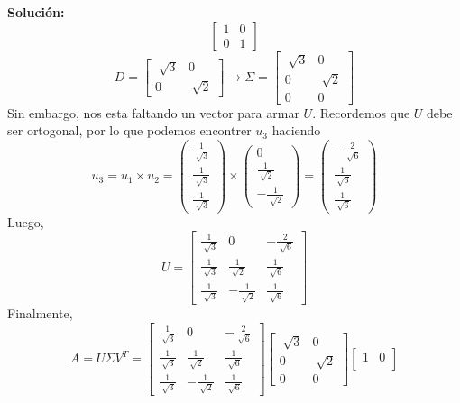 \documentclass[12pt]{article}
\newenvironment{solucion}
{\begin{mdframed}[backgroundcolor=black!10]
		{\bf Solución:}\\
	}
	{
	\end{mdframed}
}
\newenvironment{preguntas}
{\begin{enumerate}\itemsep12pt
	}
	{
	\end{enumerate}
}
\newcommand{\ra}{\rightarrow}
\begin{document}
\begin{preguntas}
\begin{solucion}
$$\begin{bmatrix}
1 & 0 \\
0 & 1
\end{bmatrix}$$
$$D = \begin{bmatrix}
\sqrt[]{3} & 0 \\
0 & \sqrt[]{2}
\end{bmatrix} \ra \Sigma = \begin{bmatrix}
\sqrt[]{3} & 0 \\
0 & \sqrt[]{2}\\
0 & 0
\end{bmatrix}$$
Sin embargo, nos esta faltando un vector para armar $U$. Recordemos que $U$ debe ser ortogonal, por lo que podemos encontrer $u_3$ haciendo
$$u_3 = u_1 \times u_2 = \begin{pmatrix}
\frac{1}{\sqrt[]{3}} \\
\frac{1}{\sqrt[]{3}} \\
\frac{1}{\sqrt[]{3}}
\end{pmatrix} \times 
\begin{pmatrix}
0 \\
\frac{1}{\sqrt[]{2}} \\
-\frac{1}{\sqrt[]{2}}
\end{pmatrix} =
\begin{pmatrix}
-\frac{2}{\sqrt[]{6}} \\
\frac{1}{\sqrt[]{6}} \\
\frac{1}{\sqrt[]{6}}
\end{pmatrix}
$$
Luego,
$$U = \begin{bmatrix}
\frac{1}{\sqrt[]{3}} & 0 & -\frac{2}{\sqrt[]{6}}\\
\frac{1}{\sqrt[]{3}} & \frac{1}{\sqrt[]{2}} & \frac{1}{\sqrt[]{6}} \\
\frac{1}{\sqrt[]{3}} &-\frac{1}{\sqrt[]{2}} & \frac{1}{\sqrt[]{6}}
\end{bmatrix}$$
Finalmente,
$$A = U\Sigma V^T =
\begin{bmatrix}
\frac{1}{\sqrt[]{3}} & 0 & -\frac{2}{\sqrt[]{6}}\\
\frac{1}{\sqrt[]{3}} & \frac{1}{\sqrt[]{2}} & \frac{1}{\sqrt[]{6}} \\
\frac{1}{\sqrt[]{3}} &-\frac{1}{\sqrt[]{2}} & \frac{1}{\sqrt[]{6}}
\end{bmatrix}
\begin{bmatrix}
\sqrt[]{3} & 0 \\
0 & \sqrt[]{2}\\
0 & 0
\end{bmatrix}
\begin{bmatrix}
1 & 0 \\

\end{bmatrix}$$
\end{solucion}
\end{preguntas}
\end{document}
